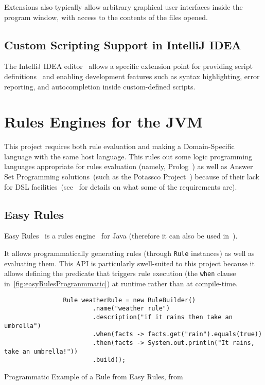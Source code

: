 Extensions also typically allow arbitrary graphical user interfaces inside the program window, with access to the contents of the files opened.

\subsection{Custom Scripting Support in IntelliJ IDEA}\label{subsec:scripting-in-intellij}

The IntelliJ IDEA editor~\cite{intelliJRepo} allows a specific extension point for providing script definitions~\cite{kotlinScriptKeep, ideaExtensionPoints} and enabling development features such as syntax highlighting, error reporting, and autocompletion inside custom-defined scripts.


\section{Rules Engines for the JVM}\label{sec:rules-engines}

This project requires both rule evaluation and making a Domain-Specific language with the same host language.
This rules out some logic programming languages appropriate for rules evaluation (namely, Prolog~\cite{prologBirth1988}) as well as Answer Set Programming solutions~(such as the Potassco Project~\cite{potassco}) because of their lack for DSL facilities~(see~ for details on what some of the requirements are).

\subsection{Easy Rules}\label{subsec:j-easy-rules}

Easy Rules~\cite{easyRules} is a rules engine~\cite{fowlerRulesEngine} for Java (therefore it can also be used in~).

It allows programmatically generating rules (through \texttt{Rule} instances) as well as evaluating them.
This API is particularly swell-suited to this project because it allows defining the predicate that triggers rule execution (the \texttt{when} clause in~\autoref{fig:easyRulesProgranmmatic}) at runtime rather than at compile-time.

\begin{listing}[h]
    \begin{verbatim}
                Rule weatherRule = new RuleBuilder()
                        .name("weather rule")
                        .description("if it rains then take an umbrella")
                        .when(facts -> facts.get("rain").equals(true))
                        .then(facts -> System.out.println("It rains, take an umbrella!"))
                        .build();
    \end{verbatim}
    \caption[Programmatic Example of a Rule from Easy Rules]{Programmatic Example of a Rule from Easy Rules, from~\cite{easyRules}}
    \label{fig:easyRulesProgranmmatic}
\end{listing}

